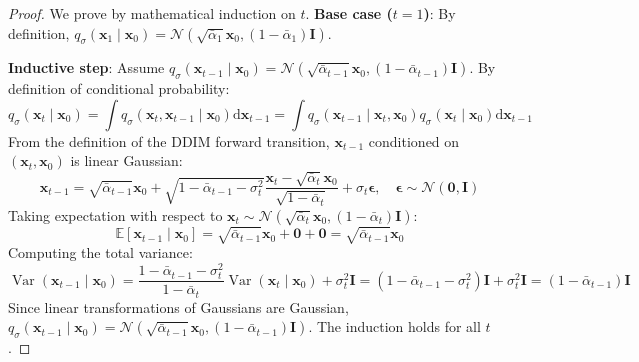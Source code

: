\documentclass[11pt,a4paper]{article}
\theoremstyle{definition}
\begin{document}
\begin{proof}
We prove by mathematical induction on $t$.
\textbf{Base case ($t = 1$)}: By definition, $q_\sigma(\mathbf{x}_1 \mid \mathbf{x}_0) = \mathcal{N}(\sqrt{\bar{\alpha}_1}\mathbf{x}_0, (1 - \bar{\alpha}_1)\mathbf{I})$.

\textbf{Inductive step}: Assume $q_\sigma(\mathbf{x}_{t-1} \mid \mathbf{x}_0) = \mathcal{N}(\sqrt{\bar{\alpha}_{t-1}}\mathbf{x}_0, (1 - \bar{\alpha}_{t-1})\mathbf{I})$. By definition of conditional probability:
{\boldmath
\begin{equation}
q_\sigma(\mathbf{x}_t \mid \mathbf{x}_0) = \int q_\sigma(\mathbf{x}_t, \mathbf{x}_{t-1} \mid \mathbf{x}_0) \mathrm{d}\mathbf{x}_{t-1} = \int q_\sigma(\mathbf{x}_{t-1} \mid \mathbf{x}_t, \mathbf{x}_0) q_\sigma(\mathbf{x}_t \mid \mathbf{x}_0) \mathrm{d}\mathbf{x}_{t-1}
\end{equation}
}
From the definition of the DDIM forward transition, $\mathbf{x}_{t-1}$ conditioned on $(\mathbf{x}_t, \mathbf{x}_0)$ is linear Gaussian:
{\boldmath
\begin{equation}
\mathbf{x}_{t-1} = \sqrt{\bar{\alpha}_{t-1}}\mathbf{x}_0 + \sqrt{1 - \bar{\alpha}_{t-1} - \sigma_t^2}\frac{\mathbf{x}_t - \sqrt{\bar{\alpha}_t}\mathbf{x}_0}{\sqrt{1 - \bar{\alpha}_t}} + \sigma_t \boldsymbol{\epsilon}, \quad \boldsymbol{\epsilon} \sim \mathcal{N}(\mathbf{0}, \mathbf{I})
\end{equation}
}
Taking expectation with respect to $\mathbf{x}_t \sim \mathcal{N}(\sqrt{\bar{\alpha}_t}\mathbf{x}_0, (1 - \bar{\alpha}_t)\mathbf{I})$:
{\boldmath
\begin{equation}
\mathbb{E}[\mathbf{x}_{t-1} \mid \mathbf{x}_0] = \sqrt{\bar{\alpha}_{t-1}}\mathbf{x}_0 + \mathbf{0} + \mathbf{0} = \sqrt{\bar{\alpha}_{t-1}}\mathbf{x}_0
\end{equation}
}
Computing the total variance:
{\boldmath
\begin{equation}
\operatorname{Var}(\mathbf{x}_{t-1} \mid \mathbf{x}_0) = \frac{1 - \bar{\alpha}_{t-1} - \sigma_t^2}{1 - \bar{\alpha}_t}\operatorname{Var}(\mathbf{x}_t \mid \mathbf{x}_0) + \sigma_t^2 \mathbf{I} = (1 - \bar{\alpha}_{t-1} - \sigma_t^2)\mathbf{I} + \sigma_t^2 \mathbf{I} = (1 - \bar{\alpha}_{t-1})\mathbf{I}
\end{equation}
}
Since linear transformations of Gaussians are Gaussian, $q_\sigma(\mathbf{x}_{t-1} \mid \mathbf{x}_0) = \mathcal{N}(\sqrt{\bar{\alpha}_{t-1}}\mathbf{x}_0, (1 - \bar{\alpha}_{t-1})\mathbf{I})$. The induction holds for all $t$.
\end{proof}
\end{document}
